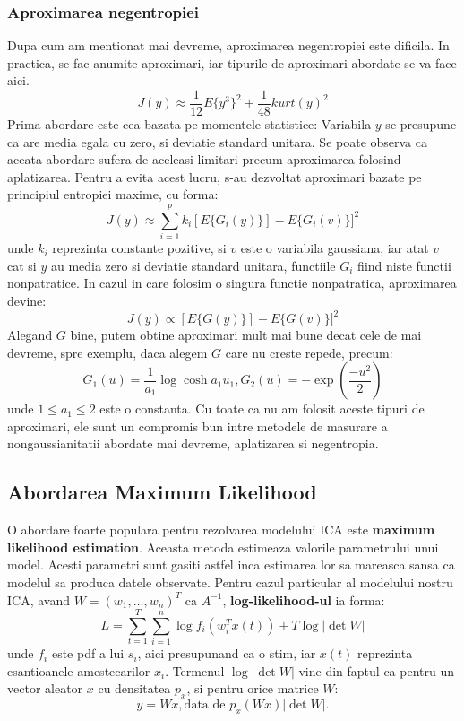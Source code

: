 \documentclass[12pt,oneside]{article}
\begin{document}
\subsubsection{Aproximarea negentropiei}
Dupa cum am mentionat mai devreme, aproximarea negentropiei este dificila. In practica, se fac anumite aproximari, iar tipurile de aproximari abordate se va face aici. 
\begin{equation}
	J(y)\approx \frac{1}{12}E\{y^3\}^2 + \frac{1}{48}kurt(y)^2
\end{equation}
Prima abordare este cea bazata pe momentele statistice:
Variabila $y$ se presupune ca are media egala cu zero, si deviatie standard unitara. Se poate observa ca aceata abordare sufera de aceleasi limitari precum aproximarea folosind aplatizarea. Pentru a evita acest lucru, s-au dezvoltat aproximari bazate pe principiul entropiei maxime, cu forma:
\begin{equation}
	J(y)\approx\sum_{i=1}^p k_i[E\{G_i(y)\}]-E\{G_i(v)\}]^2
\end{equation}
unde $k_i$ reprezinta constante pozitive, si $v$ este o variabila gaussiana, iar atat $v$ cat si $y$ au media zero si deviatie standard unitara, functiile $G_i$ fiind niste functii nonpatratice. In cazul in care folosim o singura functie nonpatratica, aproximarea devine:
\begin{equation}
	J(y)\propto[E\{G(y)\}]-E\{G(v)\}]^2
\end{equation}
Alegand $G$ bine, putem obtine aproximari mult mai bune decat cele de mai devreme, spre exemplu, daca alegem $G$ care nu creste repede, precum:
\begin{equation}
	G_1(u)=\frac{1}{a_1}\log \cosh a_1 u_1, G_2(u)=-\exp(\frac{-u^2}{2})
\end{equation}
unde $1\leq a_1 \leq 2$ este o constanta. Cu toate ca nu am folosit aceste tipuri de aproximari, ele sunt un compromis bun intre metodele de masurare a nongaussianitatii abordate mai devreme, aplatizarea si negentropia. 

\subsection{Abordarea Maximum Likelihood}
O abordare foarte populara pentru rezolvarea modelului ICA este \textbf{maximum likelihood estimation}. Aceasta metoda estimeaza valorile parametrului unui model.\cite{probability_concepts} Acesti parametri sunt gasiti astfel inca estimarea lor sa mareasca sansa ca modelul sa produca datele observate. Pentru cazul particular al modelului nostru ICA, avand $W=(w_1, \dots, w_n)^T$ ca $A^{-1}$, \textbf{log-likelihood-ul} ia forma:
\begin{equation}
	L=\sum_{t=1}^T \sum_{i=1}^n \log f_i(w_i^Tx(t)) + T \log |\det W|
\end{equation}
unde $f_i$ este pdf a lui $s_i$, aici presupunand ca o stim, iar $x(t)$ reprezinta esantioanele amestecarilor $x_i$. Termenul $\log | \det W|$ vine din faptul ca pentru un vector aleator $x$ cu densitatea $p_x$, si pentru orice matrice $W$:
\begin{equation}
	y=Wx, \text{data de } p_x(Wx)|\det W|.
\end{equation}
\end{document}
